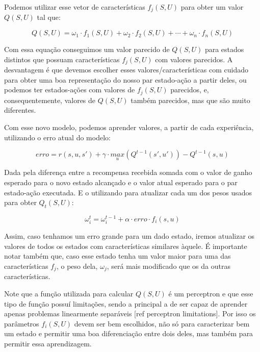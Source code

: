 Podemos utilizar esse vetor de características $ f_j \left( S, U \right) $ para obter um valor $ Q \left( S, U \right) $ tal que:

\begin{equation} \label{equation:QValueGeneralizado}
	Q \left( S, U \right) = \omega_1 \cdot f_1 \left( S, U \right) + \omega_2 \cdot f_2 \left( S, U \right) + \cdots + \omega_n \cdot f_n \left( S, U \right)
\end{equation}

Com essa equação conseguimos um valor parecido de $ Q \left( S, U \right) $ para estados distintos que possuam características $ f_j \left( S, U \right) $ com valores parecidos. A desvantagem é que devemos escolher esses valores/características com cuidado para obter uma boa representação do nosso par estado-ação a partir deles, ou podemos ter estados-ações com valores de $ f_j \left( S, U \right)$ parecidos, e, consequentemente, valores de $ Q \left( S, U \right) $ também parecidos, mas que são muito diferentes.

Com esse novo modelo, podemos aprender valores, a partir de cada experiência, utilizando o erro atual do modelo:

\begin{equation}
	erro = r \left( s, u, s' \right) + \gamma \cdot \underset{u}{max} \left( Q^{t-1} \left( s', u' \right) \right) - Q^{t-1} \left( s, u \right)
\end{equation}

Dada pela diferença entre a recompensa recebida somada com o valor de ganho esperado para o novo estado alcançado e o valor atual esperado para o par estado-ação executada. E o utilizando para atualizar cada um dos pesos usados para obter $ Q_t \left( S, U \right) $:

\begin{equation}
	\omega_i^t = \omega_i^{t-1} + \alpha \cdot erro \cdot f_i \left( s, u \right)
\end{equation}

Assim, caso tenhamos um erro grande para um dado estado, iremos atualizar os valores de todos os estados com características similares àquele. É importante notar também que, caso esse estado tenha um valor maior para uma das características $ f_j $, o peso dela, $ \omega_j $, será mais modificado que os da outras características.

Note que a função utilizada para calcular $ Q \left( S, U \right) $ é um perceptron e que esse tipo de função possuí limitações, sendo a principal a de ser capaz de aprender apenas problemas linearmente separáveis [ref perceptron limitations]. Por isso os parâmetros $ f_i \left( S, U \right) $ devem ser bem escolhidos, não só para caracterizar bem um estado e permitir uma boa diferenciação entre dois deles, mas também para permitir essa aprendizagem.

